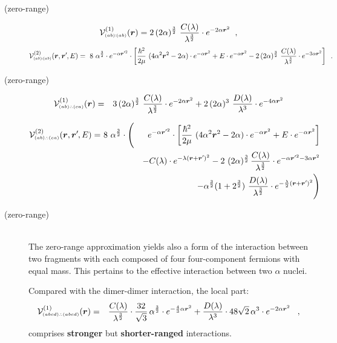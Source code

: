 \documentclass[onecolumn,preprint,superscriptaddress,nofootinbib,notitlepage,10pt,linenumbers]{revtex4-1}
\newcommand*{\mprime}{^{\prime}\mkern-1.2mu}
\newcommand{\be}{\begin{equation}}
\newcommand{\ee}{\end{equation}}
\newcommand{\ve}[1]{\ensuremath{\boldsymbol{#1}}}
\newcommand{\cc}{\ensuremath C(\lambda)}
\newcommand{\dd}{\ensuremath D(\lambda)}
\newcommand{\abab}{\ensuremath $(ab)\!\!:\!\!(ab)$}
\newcommand{\abca}{\ensuremath $(ab)\wasytherefore(ca)$}
\newcommand{\alal}{\ensuremath $(abcd)\wasytherefore(abcd)$}
\begin{document}
\begin{description}
	\item[(zero-range)~\abab]
\be
\mathcal{V}^{(1)}_{\text{\tiny\abab}}(\ve{r})=
2\,(2\alpha)^{\frac{3}{2}}~\frac{\cc}{\lambda^{\frac{3}{2}}}\cdot
 e^{-2\alpha\ve{r}^2}\;\;,
\ee
\be
\mathcal{V}^{(2)}_{\text{\tiny\abab}}(\ve{r},\ve{r}\mprime,E)=
~8~\alpha^{\frac{3}{2}}\cdot e^{-\alpha\ve{r}\mprime^2}\cdot
\left[\frac{\hbar^2}{2\mu}~(4\alpha^2\ve{r}^2-2\alpha)
\cdot e^{-\alpha\ve{r}^2}+
E\cdot e^{-\alpha\ve{r}^2}
-2\,(2\alpha)^{\frac{3}{2}}~\frac{\cc}{\lambda^{\frac{3}{2}}}\cdot
 e^{-3\alpha\ve{r}^2}\right]\;\;.
\ee

\item[(zero-range)~\abca]
\begin{eqnarray}
\mathcal{V}^{(1)}_{\text{\tiny\abca}}(\ve{r})&=&
3\,(2\alpha)^{\frac{3}{2}}~\frac{\cc}{\lambda^{\frac{3}{2}}}\cdot
 e^{-2\alpha\ve{r}^2}
 +2\,(2\alpha)^{3}~\frac{\dd}{\lambda^{3}}\cdot
 e^{-4\alpha\ve{r}^2}
\end{eqnarray}


\begin{eqnarray}
\mathcal{V}^{(2)}_{\text{\tiny\abca}}(\ve{r},\ve{r}\mprime,E)=&~8~\alpha^{\frac{3}{2}}\cdot\Bigg(&e^{-\alpha\ve{r}\mprime^2}\cdot
\left[\frac{\hbar^2}{2\mu}~(4\alpha^2\ve{r}^2-2\alpha)
\cdot e^{-\alpha\ve{r}^2}+
E\cdot e^{-\alpha\ve{r}^2}\right]\\
&&-\cc\cdot
 e^{-\lambda(\ve{r}+\ve{r}\mprime)^2}
-2~(2\alpha)^{\frac{3}{2}}\,\frac{\cc}{\lambda^{\frac{3}{2}}}\cdot
 e^{-\alpha\ve{r}\mprime^2-3\alpha\ve{r}^2}\\
 &&-\alpha^{\frac{3}{2}}(1+2^{\frac{3}{2}})~\frac{\dd}{\lambda^{\frac{3}{2}}}\cdot
 e^{-\frac{\lambda}{2}(\ve{r}+\ve{r}\mprime)^2}\Bigg)
\end{eqnarray}


\item[(zero-range)~\alal]\hfil\\
The zero-range approximation yields also a form of the interaction between two fragments with each composed of
four four-component fermions with equal mass. This pertains to the effective interaction between two
$\alpha$ nuclei.

Compared with the dimer-dimer interaction, the local part:
\begin{eqnarray}
\mathcal{V}^{(1)}_{\text{\tiny\alal}}(\ve{r})&=&
\frac{\cc}{\lambda^{\frac{3}{2}}}\cdot\frac{32}{\sqrt{3}}\,\alpha^{\frac{3}{2}}\cdot
 e^{-\frac{4}{3}\alpha\ve{r}^2}
 +\frac{\dd}{\lambda^3}\cdot48\sqrt{2}\,\alpha^3\cdot
 e^{-2\alpha\ve{r}^2}\;\;\;,
\end{eqnarray}
comprises {\bf stronger} but {\bf shorter-ranged} interactions.


\end{description}
\end{document}
